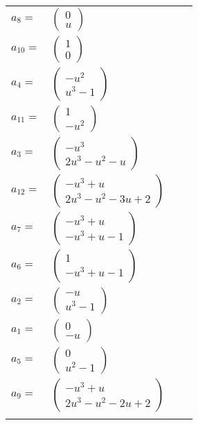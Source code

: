 \documentclass[1p]{elsarticle_modified}
\theoremstyle{definition}
\begin{document}
\begin{tabular}{m{7pt} m{180pt} m{7pt} m{180pt} }
\flushright $a_{8}=$&$\begin{pmatrix}0\\u\end{pmatrix}$ \\
\flushright $a_{10}=$&$\begin{pmatrix}1\\0\end{pmatrix}$ \\
\flushright $a_{4}=$&$\begin{pmatrix}- u^2\\u^3-1\end{pmatrix}$ \\
\flushright $a_{11}=$&$\begin{pmatrix}1\\- u^2\end{pmatrix}$ \\
\flushright $a_{3}=$&$\begin{pmatrix}- u^3\\2 u^3- u^2- u\end{pmatrix}$ \\
\flushright $a_{12}=$&$\begin{pmatrix}- u^3+u\\2 u^3- u^2-3 u+2\end{pmatrix}$ \\
\flushright $a_{7}=$&$\begin{pmatrix}- u^3+u\\- u^3+u-1\end{pmatrix}$ \\
\flushright $a_{6}=$&$\begin{pmatrix}1\\- u^3+u-1\end{pmatrix}$ \\
\flushright $a_{2}=$&$\begin{pmatrix}- u\\u^3-1\end{pmatrix}$ \\
\flushright $a_{1}=$&$\begin{pmatrix}0\\- u\end{pmatrix}$ \\
\flushright $a_{5}=$&$\begin{pmatrix}0\\u^2-1\end{pmatrix}$ \\
\flushright $a_{9}=$&$\begin{pmatrix}- u^3+u\\2 u^3- u^2-2 u+2\end{pmatrix}$\\&\end{tabular}
\end{document}
